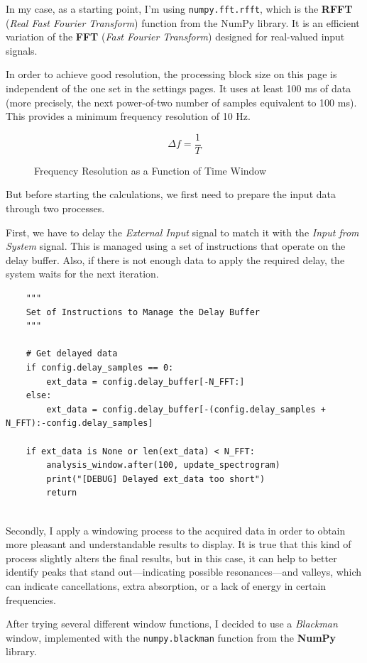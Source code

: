 In my case, as a starting point, I’m using \texttt{numpy.fft.rfft}, which is the \textbf{RFFT} (\textit{Real Fast Fourier Transform}) function from the NumPy library. It is an efficient variation of the \textbf{FFT} (\textit{Fast Fourier Transform}) designed for real-valued input signals.

In order to achieve good resolution, the processing block size on this page is independent of the one set in the settings pages. It uses at least 100 ms of data (more precisely, the next power-of-two number of samples equivalent to 100 ms). This provides a minimum frequency resolution of 10 Hz.

\begin{figure}[H]
	\centering
	\caption{Frequency Resolution as a Function of Time Window}
	\[
	\Delta f = \frac{1}{T}
	\]
\end{figure}

But before starting the calculations, we first need to prepare the input data through two processes.

First, we have to delay the \textit{External Input} signal to match it with the \textit{Input from System} signal. This is managed using a set of instructions that operate on the delay buffer. Also, if there is not enough data to apply the required delay, the system waits for the next iteration.

\begin{verbatim}
	"""
	Set of Instructions to Manage the Delay Buffer
	"""
	
    # Get delayed data
	if config.delay_samples == 0:
		ext_data = config.delay_buffer[-N_FFT:]
	else:
		ext_data = config.delay_buffer[-(config.delay_samples + N_FFT):-config.delay_samples]

	if ext_data is None or len(ext_data) < N_FFT:
		analysis_window.after(100, update_spectrogram)
		print("[DEBUG] Delayed ext_data too short")
		return
	
\end{verbatim}

Secondly, I apply a windowing process to the acquired data in order to obtain more pleasant and understandable results to display. It is true that this kind of process slightly alters the final results, but in this case, it can help to better identify peaks that stand out—indicating possible resonances—and valleys, which can indicate cancellations, extra absorption, or a lack of energy in certain frequencies.

After trying several different window functions, I decided to use a \textit{Blackman} window, implemented with the \texttt{numpy.blackman} function from the \textbf{NumPy} library.

